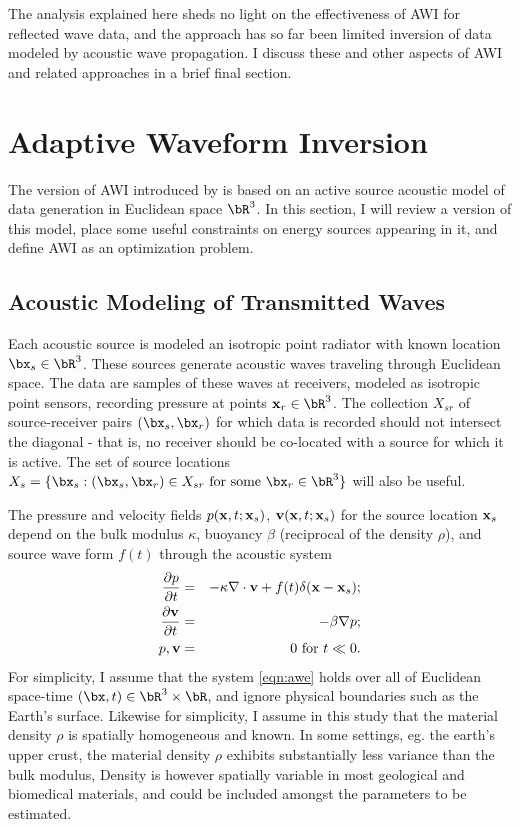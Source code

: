 The analysis explained here sheds no light on the effectiveness of AWI
for reflected wave data, and the approach has so far been limited
inversion of data modeled by acoustic wave propagation. I discuss
these and other aspects of AWI and related approaches in a brief final
section.

\section{Adaptive Waveform Inversion}

The version of AWI introduced by \cite{Warner:16} is based on an
active source acoustic model of data generation in Euclidean space
$\bR^3$. In this section, I will review a version of this model, place
some useful constraints on energy sources appearing in it, and define
AWI as an optimization problem.

\subsection{Acoustic Modeling of Transmitted Waves}

Each acoustic source is modeled an isotropic point radiator
with known location $\bx_s\in \bR^3$. These
sources generate acoustic waves traveling through Euclidean space. The
data are samples of these waves at receivers, modeled as isotropic
point sensors, recording pressure at points
${\bf x}_r \in \bR^3$. The collection $X_{sr}$ of source-receiver pairs
$(\bx_s,\bx_r)$ for which data is recorded should not intersect the
diagonal - that is, no receiver should be co-located with a source for
which it is active. The set of source locations $X_s = \{\bx_s: (\bx_s,\bx_r) \in X_{sr}
\mbox{ for some } \bx_r \in \bR^3\}$ will also be useful.

The pressure and velocity fields $p({\bf x},t;{\bf x}_s)$,
${\bf v}({\bf x},t;{\bf x}_s)$ for the source location ${\bf x}_s$
depend on the bulk modulus $\kappa$, buoyancy $\beta$
(reciprocal of the density $\rho$), and source wave
form $f(t)$ through the acoustic system
\begin{eqnarray}
  \label{eqn:awe}
 \frac{\partial p}{\partial t} & = &- \kappa \nabla \cdot {\bf v} +
                                    f(t) \delta({\bf x}-{\bf x}_s); \nonumber \\
\frac{\partial {\bf v}}{\partial t} & = & - \beta \nabla p; \\ 
p, {\bf v} & = & 0 \mbox{ for }  t \ll 0.
\end{eqnarray}
For simplicity, I assume that the system \ref{eqn:awe} holds over all of Euclidean
space-time $(\bx,t) \in \bR^3 \times \bR$, and ignore physical
boundaries such as the Earth's surface. Likewise for simplicity, I
assume in this study that the material density $\rho$ is spatially
homogeneous and known. In some settings, eg. the earth's
upper crust, the material density $\rho$ exhibits substantially less variance than the
bulk modulus, Density is however spatially variable in most geological
and biomedical materials, and could be included amongst the parameters
to be estimated.

